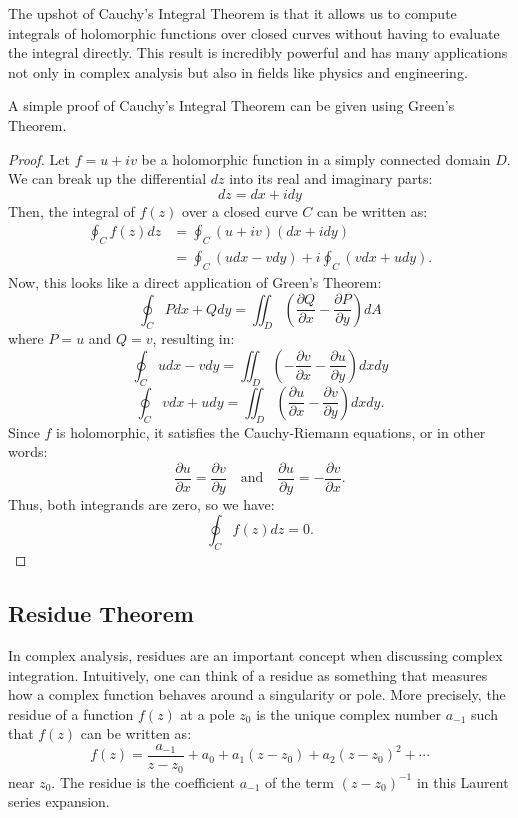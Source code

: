 \documentclass[12pt,letterpaper]{article}
\begin{document}
The upshot of Cauchy's Integral Theorem is that it allows us to compute integrals of holomorphic functions over closed curves without having to evaluate the integral directly.
This result is incredibly powerful and has many applications not only in complex analysis but also in fields like physics and engineering.

A simple proof of Cauchy's Integral Theorem can be given using Green's Theorem.
\begin{proof}
    Let $f = u + iv$ be a holomorphic function in a simply connected domain $D$.
    We can break up the differential $dz$ into its real and imaginary parts:
    $$ dz = dx + i dy $$
    Then, the integral of $f(z)$ over a closed curve $C$ can be written as:
    \begin{align*}
        \oint_C f(z) dz &= \oint_C (u + iv)(dx + i dy) \\
        &= \oint_C (u dx - v dy) + i \oint_C (v dx + u dy).
    \end{align*}
    Now, this looks like a direct application of Green's Theorem:
    $$ \oint_C P dx + Q dy = \iint_D \left( \frac{\partial Q}{\partial x} - \frac{\partial P}{\partial y} \right) dA $$
    where $P = u$ and $Q = v$, resulting in:
    $$ \oint_C u dx - v dy = \iint_D \left( - \frac{\partial v}{\partial x} - \frac{\partial u}{\partial y} \right) dx dy $$
    $$ \oint_C v dx + u dy = \iint_D \left( \frac{\partial u}{\partial x} - \frac{\partial v}{\partial y} \right) dx dy .$$
    Since $f$ is holomorphic, it satisfies the Cauchy-Riemann equations, or in other words:
    $$ \frac{\partial u}{\partial x} = \frac{\partial v}{\partial y} \quad \text{and} \quad \frac{\partial u}{\partial y} = -\frac{\partial v}{\partial x}. $$
    Thus, both integrands are zero, so we have:
    $$ \oint_C f(z) dz = 0. $$
\end{proof}

\subsection{Residue Theorem}
In complex analysis, residues are an important concept when discussing complex integration.
Intuitively, one can think of a residue as something that measures how a complex function behaves around a singularity or pole. 
More precisely, the residue of a function $f(z)$ at a pole $z_0$ is the unique complex number $a_{-1}$ such that $f(z)$ can be written as:
$$f(z) = \frac{a_{-1}}{z-z_0} + a_0 + a_1(z-z_0) + a_2(z-z_0)^2 + \cdots$$
near $z_0$. 
The residue is the coefficient $a_{-1}$ of the term $(z-z_0)^{-1}$ in this Laurent series expansion.
\end{document}
